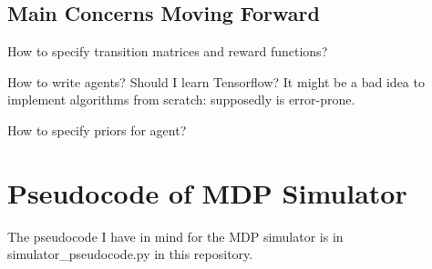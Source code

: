 \documentclass{article}
\begin{document}
\subsection{Main Concerns Moving Forward}
How to specify transition matrices and reward functions?

How to write agents? Should I learn Tensorflow? It might be a bad idea to implement algorithms from scratch: supposedly is error-prone.

How to specify priors for agent?

\section{Pseudocode of MDP Simulator}

The pseudocode I have in mind for the MDP simulator is in simulator\_pseudocode.py in this repository.
\end{document}

